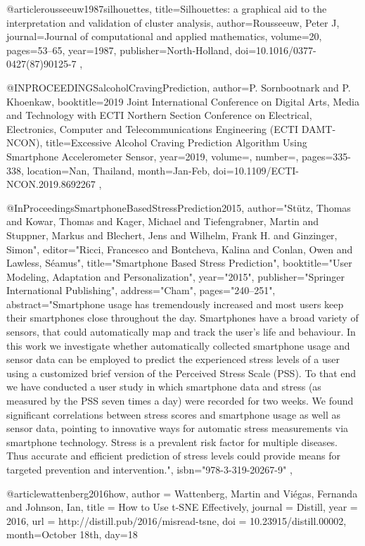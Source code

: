 @article{rousseeuw1987silhouettes,
  title={Silhouettes: a graphical aid to the interpretation and validation of cluster analysis},
  author={Rousseeuw, Peter J},
  journal={Journal of computational and applied mathematics},
  volume={20},
  pages={53--65},
  year={1987},
  publisher={North-Holland},
  doi={10.1016/0377-0427(87)90125-7}
},

@INPROCEEDINGS{alcoholCravingPrediction,  
  author={P. {Sornbootnark} and P. {Khoenkaw}},  
  booktitle={2019 Joint International Conference on Digital Arts, Media and Technology with ECTI Northern Section Conference on Electrical, Electronics, Computer and Telecommunications Engineering (ECTI DAMT-NCON)},  
  title={Excessive Alcohol Craving Prediction Algorithm Using Smartphone Accelerometer Sensor},   
  year={2019},  
  volume={},  
  number={},  
  pages={335-338},
  location={Nan, Thailand},
  month={Jan-Feb},
  doi={10.1109/ECTI-NCON.2019.8692267}
},


@InProceedings{SmartphoneBasedStressPrediction2015,
  author="St{\"u}tz, Thomas
  and Kowar, Thomas
  and Kager, Michael
  and Tiefengrabner, Martin
  and Stuppner, Markus
  and Blechert, Jens
  and Wilhelm, Frank H.
  and Ginzinger, Simon",
  editor="Ricci, Francesco
  and Bontcheva, Kalina
  and Conlan, Owen
  and Lawless, S{\'e}amus",
  title="Smartphone Based Stress Prediction",
  booktitle="User Modeling, Adaptation and Personalization",
  year="2015",
  publisher="Springer International Publishing",
  address="Cham",
  pages="240--251",
  abstract="Smartphone usage has tremendously increased and most users keep their smartphones close throughout the day. Smartphones have a broad variety of sensors, that could automatically map and track the user's life and behaviour. In this work we investigate whether automatically collected smartphone usage and sensor data can be employed to predict the experienced stress levels of a user using a customized brief version of the Perceived Stress Scale (PSS). To that end we have conducted a user study in which smartphone data and stress (as measured by the PSS seven times a day) were recorded for two weeks. We found significant correlations between stress scores and smartphone usage as well as sensor data, pointing to innovative ways for automatic stress measurements via smartphone technology. Stress is a prevalent risk factor for multiple diseases. Thus accurate and efficient prediction of stress levels could provide means for targeted prevention and intervention.",
  isbn="978-3-319-20267-9"
},

@article{wattenberg2016how,
  author = {Wattenberg, Martin and Viégas, Fernanda and Johnson, Ian},
  title = {How to Use t-SNE Effectively},
  journal = {Distill},
  year = {2016},
  url = {http://distill.pub/2016/misread-tsne},
  doi = {10.23915/distill.00002},
  month={October 18th},
  day={18}
}



